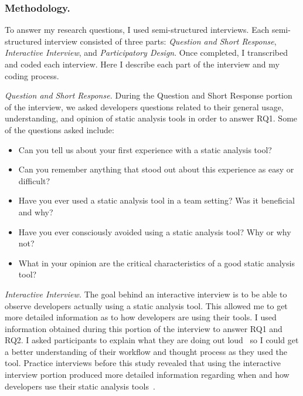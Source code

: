 \documentclass{llncs}
\begin{document}
\subsubsection{Methodology.}
To answer my research questions, I used semi-structured interviews. Each semi-structured interview consisted of three parts: \textit{Question and  Short Response}, \textit{Interactive Interview}, and \textit{Participatory Design}. Once completed, I transcribed and coded each interview. Here I describe each part of the interview and my coding process.

\vspace{0.5em}
\noindent\textit{Question and Short Response.} During the Question and Short Response portion of the interview, we asked developers questions related to their general usage, understanding, and opinion of static analysis tools in order to answer RQ1.
Some of the questions asked include:
\begin{itemize}
	\item Can you tell us about your first experience with a static analysis tool?
	\item Can you remember anything that stood out about this experience as easy or difficult?
	\item Have you ever used a static analysis tool in a team setting? Was it beneficial and why?
	\item Have you ever consciously avoided using a static analysis tool? Why or why not?
	\item What in your opinion are the critical characteristics of a good static analysis tool?
\end{itemize}

\vspace{0.5em}
\noindent\textit{Interactive Interview.}
The goal behind an interactive interview is to be able to observe developers actually using a static analysis tool. This allowed me to get more detailed information as to how developers are using their tools. I  used information obtained during this portion of the interview to answer RQ1 and RQ2. I asked participants to explain what they are doing out loud~\cite{Lewis:1982:ThinkAloudProtocol} so I could get a better understanding of their workflow and thought process as they used the tool. Practice interviews before this study revealed that using the interactive interview portion produced more detailed information regarding when and how developers use their static analysis tools~\cite{Johnson:2012:PreFFSAT}.
\end{document}
